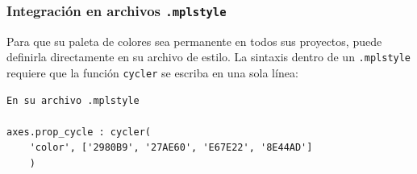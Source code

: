 \subsubsection{Integración en archivos \texttt{.mplstyle}}

Para que su paleta de colores sea permanente en todos sus proyectos, puede definirla directamente en su archivo de estilo. La sintaxis dentro de un \texttt{.mplstyle} requiere que la función \texttt{cycler} se escriba en una sola línea:

\begin{verbatim}
En su archivo .mplstyle

axes.prop_cycle : cycler(
    'color', ['2980B9', '27AE60', 'E67E22', '8E44AD']
    )
\end{verbatim}
